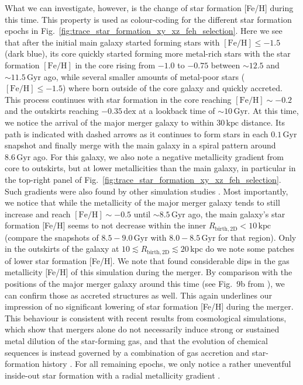 \documentclass[fleqn,usenatbib]{mnras}
\begin{document}
What we can investigate, however, is the change of star formation [Fe/H] during this time. This property is used as colour-coding for the different star formation epochs in Fig.~\ref{fig:trace_star_formation_xy_xz_feh_selection}. Here we see that after the initial main galaxy started forming stars with $\mathrm{[Fe/H]} \leq -1.5$ (dark blue), its core quickly started forming more metal-rich stars with the star formation $\mathrm{[Fe/H]}$ in the core rising from $-1.0$ to $-0.75$ between $\sim 12.5$ and $\sim11.5\,\mathrm{Gyr}$ ago, while several smaller amounts of metal-poor stars ($\mathrm{[Fe/H]} \leq -1.5$) where born outside of the core galaxy and quickly accreted. This process continues with star formation in the core reaching $\mathrm{[Fe/H]} \sim -0.2$ and the outskirts reaching $-0.35\,\mathrm{dex}$ at a lookback time of $\sim 10\,\mathrm{Gyr}$. At this time, we notice the arrival of the major merger galaxy to within $30\,\mathrm{kpc}$ distance. Its path is indicated with dashed arrows as it continues to form stars in each $0.1\,\mathrm{Gyr}$ snapshot and finally merge with the main galaxy in a spiral pattern around $8.6\,\mathrm{Gyr}$ ago. For this galaxy, we also note a negative metallicity gradient from core to outskirts, but at lower metallicities than the main galaxy, in particular in the top-right panel of Fig.~\ref{fig:trace_star_formation_xy_xz_feh_selection}. Such gradients were also found by other simulation studies \citep{Amarante2022, Khoperskov2023d, Mori2024, Carrillo2026}. Most importantly, we notice that while the metallicity of the major merger galaxy tends to still increase and reach $\mathrm{[Fe/H]} \sim -0.5$ until $\sim 8.5\,\mathrm{Gyr}$ ago, the main galaxy's star formation [Fe/H] seems to not decrease within the inner $R_\mathrm{birth,2D} < 10\,\mathrm{kpc}$ (compare the snapshots of $8.5-9.0\,\mathrm{Gyr}$ with $8.0-8.5\,\mathrm{Gyr}$ for that region). Only in the outskirts of the galaxy at $10 \lesssim R_\mathrm{birth, 2D} \lesssim 20\,\mathrm{kpc}$ do we note some patches of lower star formation [Fe/H]. We note that \citet{Buck2023} found considerable dips in the gas metallicity [Fe/H] of this simulation during the merger. By comparison with the positions of the major merger galaxy around this time (see Fig.~9b from ), we can confirm those as accreted structures as well. This again underlines our impression of no significant lowering of star formation [Fe/H] during the merger. This behaviour is consistent with recent results from cosmological simulations, which show that mergers alone do not necessarily induce strong or sustained metal dilution of the star-forming gas, and that the evolution of chemical sequences is instead governed by a combination of gas accretion and star-formation history \citep{Parul2025, Orkney2026}. For all remaining epochs, we only notice a rather uneventful inside-out star formation with a radial metallicity gradient \citep[see also][]{Buder2025}.
\end{document}
